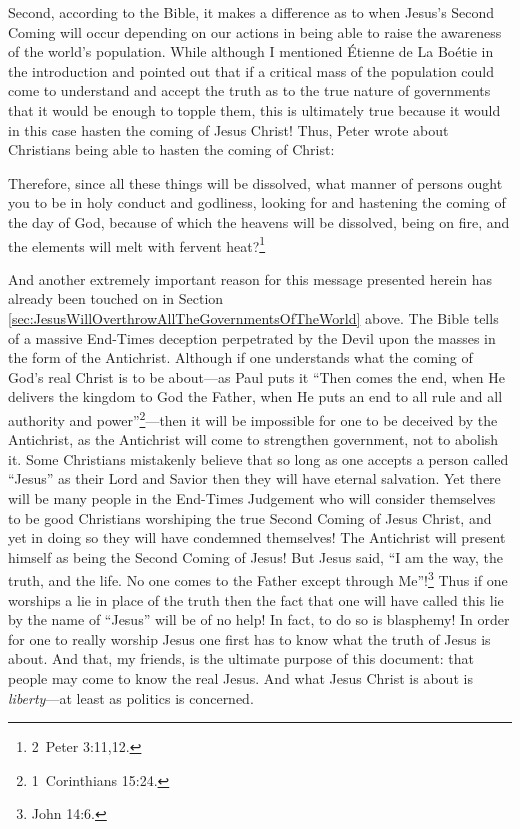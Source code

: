 \documentclass[letterpaper,12pt]{article}
\newenvironment{squote}
  {\small\quote}
  {\endquote\normalsize}
\begin{document}
Second, according to the Bible, it makes a difference as to when Jesus's Second Coming will occur depending on our actions in being able to raise the awareness of the world's population. While although I mentioned \'{E}tienne de La Bo\'{e}tie in the introduction and pointed out that if a critical mass of the population could come to understand and accept the truth as to the true nature of governments that it would be enough to topple them, this is ultimately true because it would in this case hasten the coming of Jesus Christ! Thus, Peter wrote about Christians being able to hasten the coming of Christ:

\begin{squote}
Therefore, since all these things will be dissolved, what manner of persons ought you to be in holy conduct and godliness, looking for and hastening the coming of the day of God, because of which the heavens will be dissolved, being on fire, and the elements will melt with fervent heat?\footnote{2~Peter 3:11,12.}
\end{squote}

And another extremely important reason for this message presented herein has already been touched on in Section \ref{sec:JesusWillOverthrowAllTheGovernmentsOfTheWorld} above. The Bible tells of a massive End-Times deception perpetrated by the Devil upon the masses in the form of the Antichrist. Although if one understands what the coming of God's real Christ is to be about---as Paul puts it ``Then comes the end, when He delivers the kingdom to God the Father, when He puts an end to all rule and all authority and power''\footnote{1~Corinthians 15:24.}---then it will be impossible for one to be deceived by the Antichrist, as the Antichrist will come to strengthen government, not to abolish it. Some Christians mistakenly believe that so long as one accepts a person called ``Jesus'' as their Lord and Savior then they will have eternal salvation. Yet there will be many people in the End-Times Judgement who will consider themselves to be good Christians worshiping the true Second Coming of Jesus Christ, and yet in doing so they will have condemned themselves! The Antichrist will present himself as being the Second Coming of Jesus! But Jesus said, ``I am the way, the truth, and the life. No one comes to the Father except through Me''!\footnote{John 14:6.} Thus if one worships a lie in place of the truth then the fact that one will have called this lie by the name of ``Jesus'' will be of no help! In fact, to do so is blasphemy! In order for one to really worship Jesus one first has to know what the truth of Jesus is about. And that, my friends, is the ultimate purpose of this document: that people may come to know the real Jesus. And what Jesus Christ is about is \emph{liberty}---at least as politics is concerned.
\end{document}

